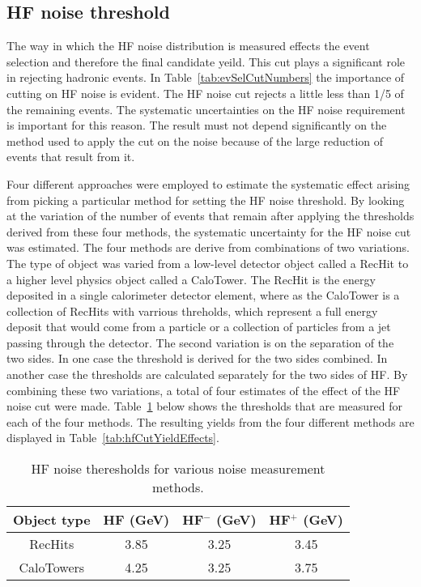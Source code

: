     \subsection{HF noise threshold}
      The way in which the HF noise distribution is measured effects the event 
        selection and therefore the final candidate yeild.
      This cut plays a significant role in rejecting hadronic events.
      In Table~\ref{tab:evSelCutNumbers} the importance of cutting on HF noise
        is evident. 
      The HF noise cut rejects a little less than 1/5 of the remaining events. 
      The systematic uncertainties on the HF noise requirement is important for
        this reason.
      The result must not depend significantly on the method used to apply the
        cut on the noise because of the large reduction of events that result
        from it. 

      Four different approaches were employed to estimate the systematic effect
        arising from picking a particular method for setting the HF noise
        threshold. 
      By looking at the variation of the number of events that remain after 
        applying the thresholds derived from these four methods, the systematic
        uncertainty for the HF noise cut was estimated.
      The four methods are derive from combinations of two variations. 
      The type of object was varied from a low-level detector object called a 
        RecHit to a higher level physics object called a CaloTower. 
      The RecHit is the energy deposited in a single calorimeter detector 
        element, where as the CaloTower is a collection of RecHits with 
        varrious threholds, which represent a full energy deposit that would 
        come from a particle or a collection of particles from a jet passing 
        through the detector. 
      The second variation is on the separation of the two sides.
      In one case the threshold is derived for the two sides combined.
      In another case the thresholds are calculated separately for the two 
        sides of HF.
      By combining these two variations, a total of four estimates of the 
        effect of the HF noise cut were made.
      Table~\ref{tab:hfNoiseThreshAsym} below shows the thresholds that are 
        measured for each of the four methods.
      The resulting yields from the four different methods are displayed in 
        Table~\ref{tab:hfCutYieldEffects}.

      \begin{table}[!Hhbt]
        \centering
        \begin{tabular}{|c|c|c|c|}
          \hline
          Object type & HF (GeV) & HF$^{-}$ (GeV) & HF$^{+}$ (GeV) \\ \hline
          RecHits & 3.85 & 3.25 & 3.45 \\ \hline
          CaloTowers & 4.25 & 3.25 & 3.75 \\ \hline
        \end{tabular}
        \caption{HF noise theresholds for various noise measurement methods.}
        \label{tab:hfNoiseThreshAsym}
      \end{table}


